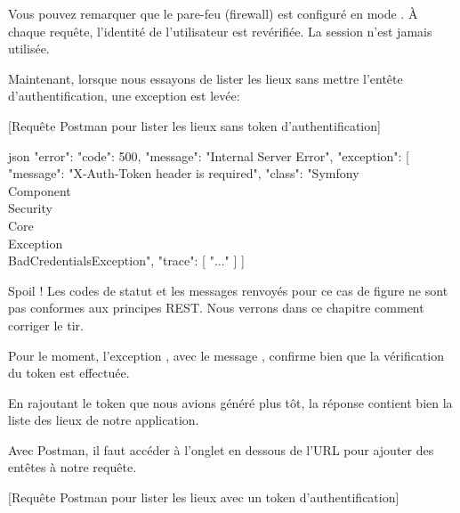 \documentclass[big]{zmdocument}
\begin{document}
\begin{Warning}
Vous pouvez remarquer que le pare-feu (firewall) est configuré en mode . À chaque requête, l'identité de l'utilisateur est revérifiée. La session n'est jamais utilisée.
\end{Warning}


Maintenant, lorsque nous essayons de lister les lieux sans mettre l'entête d'authentification, une exception est levée:



[Requête Postman pour lister les lieux sans token d'authentification]


\begin{CodeBlock}{json}
{
  "error": {
    "code": 500,
    "message": "Internal Server Error",
    "exception": [
      {
        "message": "X-Auth-Token header is required",
        "class": "Symfony\\Component\\Security\\Core\\Exception\\BadCredentialsException",
        "trace": [
            "..."
        ]
      }
    ]
  }
}
\end{CodeBlock}



Spoil ! Les codes de statut et les messages renvoyés pour ce cas de figure ne sont pas conformes aux principes REST. Nous verrons dans ce chapitre comment corriger le tir.



Pour le moment, l'exception , avec le message , confirme bien que la vérification du token est effectuée.



En rajoutant le token que nous avions généré plus tôt, la réponse contient bien la liste des lieux de notre application.



Avec Postman, il faut accéder à l'onglet  en dessous de l'URL pour ajouter des entêtes à notre requête.



[Requête Postman pour lister les lieux avec un token d'authentification]
\end{document}
